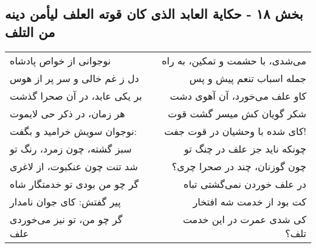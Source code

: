 \begin{center}
\section*{بخش ۱۸ - حکایة العابد الذی کان قوته العلف لیأمن دینه من التلف}
\label{sec:018}
\begin{longtable}{l p{0.5cm} r}
نوجوانی از خواص پادشاه
&&
می‌شدی، با حشمت و تمکین، به راه
\\
دل ز غم خالی و سر پر از هوس
&&
جمله اسباب تنعم پیش و پس
\\
بر یکی عابد، در آن صحرا گذشت
&&
کاو علف می‌خورد، آن آهوی دشت
\\
هر زمان، در ذکر حی لایموت
&&
شکر گویان کش میسر گشت قوت
\\
نوجوان سویش خرامید و بگفت:
&&
کای شده با وحشیان در قوت جفت!
\\
سبز گشته، چون زمرد، رنگ تو
&&
چونکه ناید جز علف در چنگ تو
\\
شد تنت چون عنکبوت، از لاغری
&&
چون گوزنان، چند در صحرا چری؟
\\
گر چو من بودی تو خدمتگار شاه
&&
در علف خوردن نمی‌گشتی تباه
\\
پیر گفتش: کای جوان نامدار
&&
کت بود از خدمت شه افتخار
\\
گر چو من، تو نیز می‌خوردی علف
&&
کی شدی عمرت در این خدمت تلف؟
\\
\end{longtable}
\end{center}
